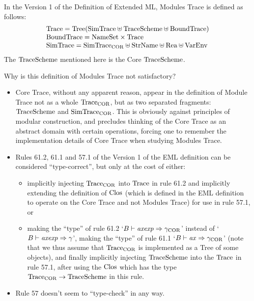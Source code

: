 In the Version 1 of the Definition of Extended ML, 
Modules Trace is defined as follows:
\begin{displaymath}
\begin{array}{l}
\mbox{Trace} = \mbox{Tree}(\mbox{SimTrace}\uplus\mbox{TraceScheme}\uplus\mbox{BoundTrace})\\
\mbox{BoundTrace}={\rm NameSet}\times\mbox{Trace}\\
\mbox{SimTrace} = \mbox{SimTrace}_{\rm COR}\uplus{\rm StrName}\uplus\mbox{Rea}\uplus{\rm VarEnv}\\
\end{array}
\end{displaymath} 
The $\mbox{TraceScheme}$ mentioned here is the Core $\mbox{TraceScheme}$.

Why is this definition of Modules Trace not satisfactory?
\begin{itemize}
\item
   Core Trace, without any apparent reason, appear in the definition 
   of Module Trace not as a whole $\mbox{Trace}_{\rm COR}$, but as two separated fragments:
   $\mbox{TraceScheme}$ and $\mbox{SimTrace}_{\rm COR}$.
   This is obviously against principles of modular construction,
   and precludes thinking of the Core Trace as an abstract domain 
   with certain operations, forcing one to remember 
   the implementation details of Core Trace when studying Modules Trace. 
\item
   Rules 61.2, 61.1 and 57.1 of the Version 1 of the EML definition 
   can be considered ``type-correct'', but only at the cost of either:
\begin{itemize}
\item 
     implicitly injecting $\mbox{Trace}_{\rm COR}$ into $\mbox{Trace}$ in rule 61.2
     and implicitly extending the definition of ${\rm Clos}$ (which is defined in
     the EML definition to operate on the Core Trace and not Modules Trace) 
     for use in rule 57.1, or
\item 
     making the ``type'' of rule 61.2 `$B\vdash{\it axexp}\Rightarrow\gamma_{\rm COR}$' 
     instead of `$B\vdash{\it axexp}\Rightarrow\gamma$', making the ``type'' of 
     rule 61.1 `$B\vdash{\it ax}\Rightarrow\gamma_{\rm COR}$' 
     (note that we thus assume that $\mbox{Trace}_{\rm COR}$ is 
     implemented as a Tree of some objects),
     and finally implicitly injecting $\mbox{TraceScheme}$ into the $\mbox{Trace}$ in rule 57.1,
     after using the ${\rm Clos}$ which has the type 
     $\mbox{Trace}_{\rm COR}\to\mbox{TraceScheme}$ in this rule.
\end{itemize}
\item
   Rule 57 doesn't seem to ``type-check'' in any way.
\end{itemize}

